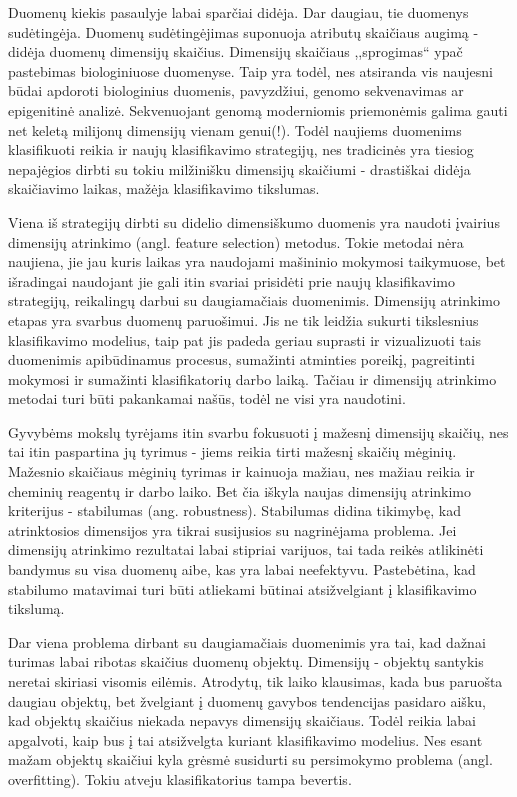 Duomenų kiekis pasaulyje labai sparčiai didėja. Dar daugiau, tie duomenys sudėtingėja. 
Duomenų sudėtingėjimas suponuoja atributų skaičiaus augimą - didėja duomenų
dimensijų skaičius. Dimensijų skaičiaus ,,sprogimas`` ypač pastebimas 
biologiniuose duomenyse. Taip yra todėl, nes atsiranda vis naujesni būdai 
apdoroti biologinius duomenis, pavyzdžiui, genomo sekvenavimas ar epigenitinė
analizė. Sekvenuojant genomą moderniomis priemonėmis galima gauti net
keletą milijonų dimensijų vienam genui(!). Todėl naujiems duomenims klasifikuoti
reikia ir naujų klasifikavimo strategijų, nes tradicinės yra tiesiog nepajėgios dirbti
su tokiu milžinišku dimensijų skaičiumi - drastiškai didėja skaičiavimo laikas, 
mažėja klasifikavimo tikslumas.
 
Viena iš strategijų dirbti su didelio dimensiškumo duomenis yra naudoti įvairius
dimensijų atrinkimo\cite{guyon2003introduction} (angl. feature selection) metodus.
Tokie metodai nėra naujiena, jie jau kuris laikas
yra naudojami mašininio mokymosi taikymuose, bet išradingai naudojant jie gali itin svariai 
prisidėti prie naujų klasifikavimo strategijų, reikalingų darbui su daugiamačiais 
duomenimis. Dimensijų atrinkimo etapas yra
svarbus duomenų paruošimui. Jis ne tik leidžia sukurti tikslesnius klasifikavimo
modelius, taip pat jis padeda geriau suprasti ir vizualizuoti tais duomenimis
apibūdinamus procesus, sumažinti atminties poreikį, pagreitinti mokymosi ir 
sumažinti klasifikatorių darbo laiką. Tačiau ir dimensijų atrinkimo metodai
turi būti pakankamai našūs, todėl ne visi yra naudotini.

Gyvybėms mokslų tyrėjams itin svarbu fokusuoti į mažesnį dimensijų skaičių,
nes tai itin paspartina jų tyrimus - jiems reikia tirti mažesnį skaičių 
mėginių. Mažesnio skaičiaus mėginių tyrimas ir kainuoja mažiau, nes mažiau 
reikia ir cheminių reagentų ir darbo laiko. Bet čia iškyla naujas dimensijų atrinkimo 
kriterijus - stabilumas (ang. robustness). Stabilumas didina tikimybę, kad atrinktosios 
dimensijos yra tikrai susijusios su nagrinėjama problema. Jei dimensijų atrinkimo
rezultatai labai stipriai varijuos, tai tada reikės atlikinėti bandymus su visa
duomenų aibe, kas yra labai neefektyvu. Pastebėtina, kad stabilumo matavimai turi
būti atliekami būtinai atsižvelgiant į klasifikavimo tikslumą.

Dar viena problema dirbant su daugiamačiais duomenimis yra tai, kad dažnai
turimas labai ribotas skaičius duomenų objektų. Dimensijų - objektų santykis 
neretai skiriasi visomis eilėmis. Atrodytų, tik laiko klausimas, kada bus paruošta
daugiau objektų, bet žvelgiant į duomenų gavybos tendencijas pasidaro aišku, kad
objektų skaičius niekada nepavys dimensijų skaičiaus. Todėl reikia labai apgalvoti,
kaip bus į tai atsižvelgta kuriant klasifikavimo modelius. Nes esant mažam
objektų skaičiui kyla grėsmė susidurti su persimokymo problema (angl. 
overfitting). Tokiu atveju klasifikatorius tampa bevertis.

